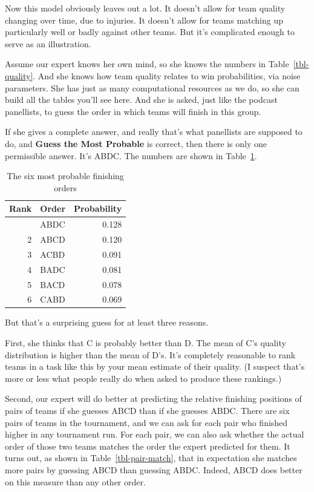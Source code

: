 \documentclass[
  11pt,
  letterpaper,
  DIV=11,
  numbers=noendperiod,
  twoside]{scrartcl}
\begin{document}
Now this model obviously leaves out a lot. It doesn't allow for team
quality changing over time, due to injuries. It doesn't allow for teams
matching up particularly well or badly against other teams. But it's
complicated enough to serve as an illustration.

Assume our expert knows her own mind, so she knows the numbers in
Table~\ref{tbl-quality}. And she knows how team quality relates to win
probabilities, via noise parameters. She has just as many computational
resources as we do, so she can build all the tables you'll see here. And
she is asked, just like the podcast panellists, to guess the order in
which teams will finish in this group.

If she gives a complete answer, and really that's what panellists are
supposed to do, and \textbf{Guess the Most Probable} is correct, then
there is only one permissible answer. It's ABDC. The numbers are shown
in Table~\ref{tbl-rank-frequency}.

{

\begin{longtable}[]{@{}rlr@{}}

\caption{\label{tbl-rank-frequency}The six most probable finishing
orders}

\tabularnewline

\toprule\noalign{}
Rank & Order & Probability \\
\midrule\noalign{}
\endhead
\bottomrule\noalign{}
\endlastfoot
1 & ABDC & 0.128 \\
2 & ABCD & 0.120 \\
3 & ACBD & 0.091 \\
4 & BADC & 0.081 \\
5 & BACD & 0.078 \\
6 & CABD & 0.069 \\

\end{longtable}

}

But that's a surprising guess for at least three reasons.

First, she thinks that C is probably better than D. The mean of C's
quality distribution is higher than the mean of D's. It's completely
reasonable to rank teams in a task like this by your mean estimate of
their quality. (I suspect that's more or less what people really do when
asked to produce these rankings.)

Second, our expert will do better at predicting the relative finishing
positions of pairs of teams if she guesses ABCD than if she guesses
ABDC. There are six pairs of teams in the tournament, and we can ask for
each pair who finished higher in any tournament run. For each pair, we
can also ask whether the actual order of those two teams matches the
order the expert predicted for them. It turns out, as shown in
Table~\ref{tbl-pair-match}, that in expectation she matches more pairs
by guessing ABCD than guessing ABDC. Indeed, ABCD does better on this
measure than any other order.
\end{document}

